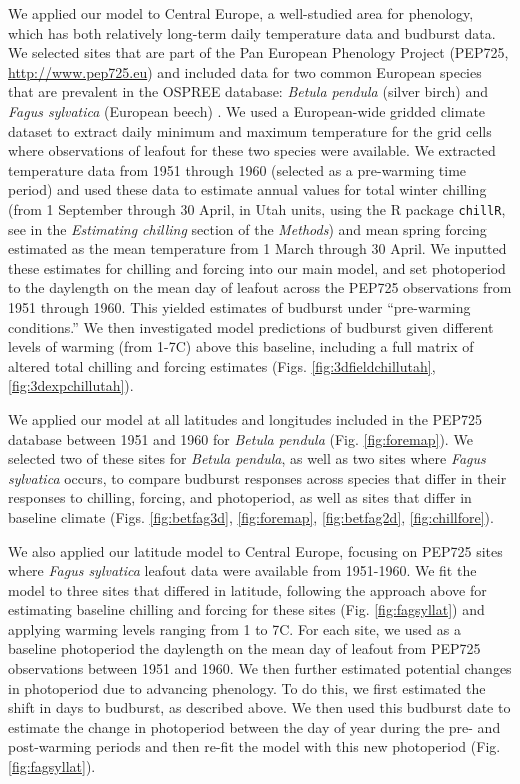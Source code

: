 \documentclass{article}
\begin{document}
\par We applied our model to Central Europe, a well-studied area for phenology, which has both relatively long-term daily temperature data and budburst data. We selected sites that are part of the Pan European Phenology Project (PEP725, \url{http://www.pep725.eu}) and included data for two common European species that are prevalent in the OSPREE database: \emph{Betula pendula} (silver birch) and \emph{Fagus sylvatica} (European beech) \emph{\citep{Templ2018}}. We used a European-wide gridded climate dataset \emph{\citep[{\normalfont E-OBS},][]{cornes2018}} to extract daily minimum and maximum temperature for the grid cells where observations of leafout for these two species were available. We extracted temperature data from 1951 through 1960 (selected as a pre-warming time period) and used these data to estimate annual values for total winter chilling (from 1 September through 30 April, in Utah units, using the R package \texttt{chillR}, see in the \emph{Estimating chilling} section of the \emph{Methods}) and mean spring forcing estimated as the mean temperature from 1 March through 30 April. We inputted these estimates for chilling and forcing into our main model, and set photoperiod to the daylength on the mean day of leafout across the PEP725 observations from 1951 through 1960. This yielded estimates of budburst under ``pre-warming conditions.'' We then investigated model predictions of budburst given different levels of warming (from 1-7\degree C) above this baseline, including a full matrix of altered total chilling and forcing estimates (Figs. \ref{fig:3dfieldchillutah}, \ref{fig:3dexpchillutah}). 
\par We applied our model at all latitudes and longitudes included in the PEP725 database between 1951 and 1960 for \emph{Betula pendula} (Fig. \ref{fig:foremap}). We selected two of these sites for \emph{Betula pendula}, as well as two sites where \emph{Fagus sylvatica} occurs, to compare budburst responses across species that differ in their responses to chilling, forcing, and photoperiod, as well as sites that differ in baseline climate (Figs. \ref{fig:betfag3d}, \ref{fig:foremap}, \ref{fig:betfag2d}, \ref{fig:chillfore}).

\par We also applied our latitude model to Central Europe, focusing on PEP725 sites where \emph{Fagus sylvatica} leafout data were available from 1951-1960. We fit the model to three sites that differed in latitude, following the approach above for estimating baseline chilling and forcing for these sites (Fig. \ref{fig:fagsyllat}) and applying warming levels ranging from 1 to 7\degree C.   For each site, we used as a baseline photoperiod the daylength on the mean day of leafout from PEP725 observations between 1951 and 1960. We then further estimated potential changes in photoperiod due to advancing phenology. To do this, we first estimated the shift in days to budburst, as described above.
We then used this budburst date to estimate the change in photoperiod between the day of year during the pre- and post-warming periods and then re-fit the model with this new photoperiod (Fig. \ref{fig:fagsyllat}). 
\end{document}
